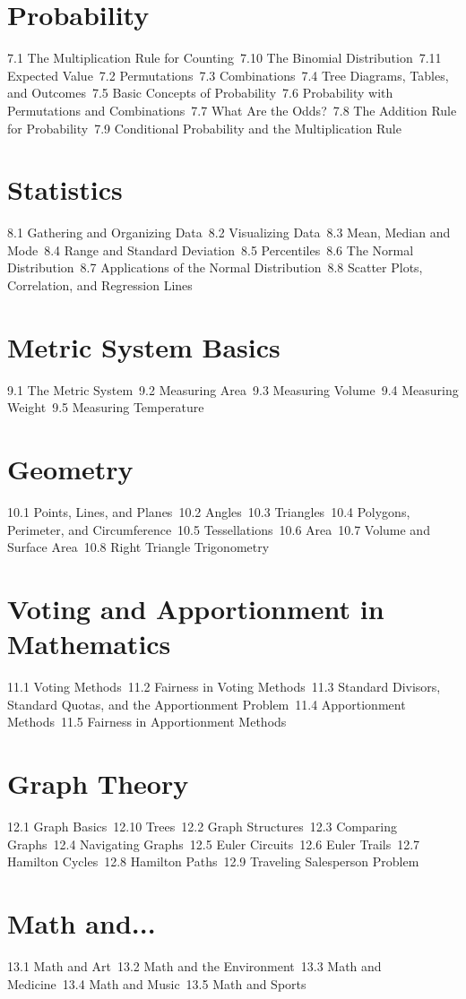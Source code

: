 \section{Probability}
7.1 The Multiplication Rule for Counting\
7.10 The Binomial Distribution\
7.11 Expected Value\
7.2 Permutations\
7.3 Combinations\
7.4 Tree Diagrams, Tables, and Outcomes\
7.5 Basic Concepts of Probability\
7.6 Probability with Permutations and Combinations\
7.7 What Are the Odds?\
7.8 The Addition Rule for Probability\
7.9 Conditional Probability and the Multiplication Rule\
\section{Statistics}
8.1 Gathering and Organizing Data\
8.2 Visualizing Data\
8.3 Mean, Median and Mode\
8.4 Range and Standard Deviation\
8.5 Percentiles\
8.6 The Normal Distribution\
8.7 Applications of the Normal Distribution\
8.8 Scatter Plots, Correlation, and Regression Lines\
\section{Metric System Basics}
9.1 The Metric System\
9.2 Measuring Area\
9.3 Measuring Volume\
9.4 Measuring Weight\
9.5 Measuring Temperature\
\section{Geometry}
10.1 Points, Lines, and Planes\
10.2 Angles\
10.3 Triangles\
10.4 Polygons, Perimeter, and Circumference\
10.5 Tessellations\
10.6 Area\
10.7 Volume and Surface Area\
10.8 Right Triangle Trigonometry\
\section{Voting and Apportionment in Mathematics}
11.1 Voting Methods\
11.2 Fairness in Voting Methods\
11.3 Standard Divisors, Standard Quotas, and the Apportionment Problem\
11.4 Apportionment Methods\
11.5 Fairness in Apportionment Methods\
\section{Graph Theory}
12.1 Graph Basics\
12.10 Trees\
12.2 Graph Structures\
12.3 Comparing Graphs\
12.4 Navigating Graphs\
12.5 Euler Circuits\
12.6 Euler Trails\
12.7 Hamilton Cycles\
12.8 Hamilton Paths\
12.9 Traveling Salesperson Problem\
\section{Math and...}
13.1 Math and Art\
13.2 Math and the Environment\
13.3 Math and Medicine\
13.4 Math and Music\
13.5 Math and Sports\
